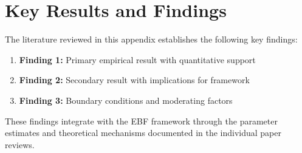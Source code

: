 \section{Key Results and Findings}
\label{sec:results}

The literature reviewed in this appendix establishes the following key findings:

\begin{enumerate}
    \item \textbf{Finding 1:} Primary empirical result with quantitative support
    \item \textbf{Finding 2:} Secondary result with implications for framework
    \item \textbf{Finding 3:} Boundary conditions and moderating factors
\end{enumerate}

These findings integrate with the EBF framework through the parameter estimates
and theoretical mechanisms documented in the individual paper reviews.

